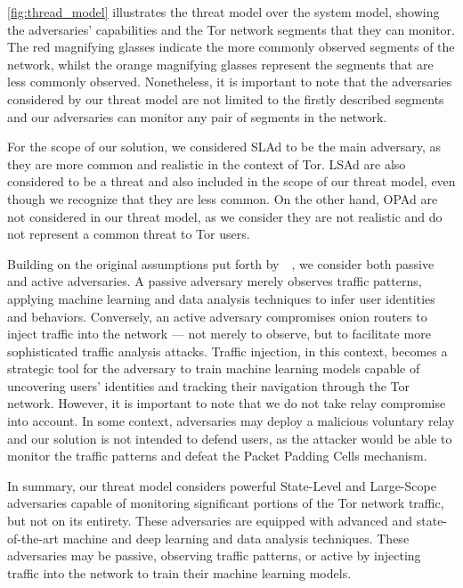 \autoref{fig:thread_model} illustrates the threat model over the system model, showing the adversaries' capabilities and the Tor network segments that they can monitor. The red magnifying glasses indicate the more commonly observed segments of the network, whilst the orange magnifying glasses represent the segments that are less commonly observed. Nonetheless, it is important to note that the adversaries considered by our threat model are not limited to the firstly described segments and our adversaries can monitor any pair of segments in the network.  

For the scope of our solution, we considered SLAd to be the main adversary, as they are more common and realistic in the context of Tor. LSAd are also considered to be a threat and also included in the scope of our threat model, even though we recognize that they are less common. On the other hand, OPAd are not considered in our threat model, as we consider they are not realistic and do not represent a common threat to Tor users.

Building on the original assumptions put forth by~\citeauthor{dingledine2004tor}~\cite{dingledine2004tor}, we consider both passive and active adversaries. A passive adversary merely observes traffic patterns, applying machine learning and data analysis techniques to infer user identities and behaviors. Conversely, an active adversary compromises onion routers to inject traffic into the network — not merely to observe, but to facilitate more sophisticated traffic analysis attacks. Traffic injection, in this context, becomes a strategic tool for the adversary to train machine learning models capable of uncovering users' identities and tracking their navigation through the Tor network. However, it is important to note that we do not take relay compromise into account. In some context, adversaries may deploy a malicious voluntary relay and our solution is not intended to defend users, as the attacker would be able to monitor the traffic patterns and defeat the Packet Padding Cells mechanism. 


In summary, our threat model considers powerful State-Level and Large-Scope adversaries capable of monitoring significant portions of the Tor network traffic, but not on its entirety. These adversaries are equipped with advanced and state-of-the-art machine and deep learning and data analysis techniques. These adversaries may be passive, observing traffic patterns, or active by injecting traffic into the network to train their machine learning models. 


